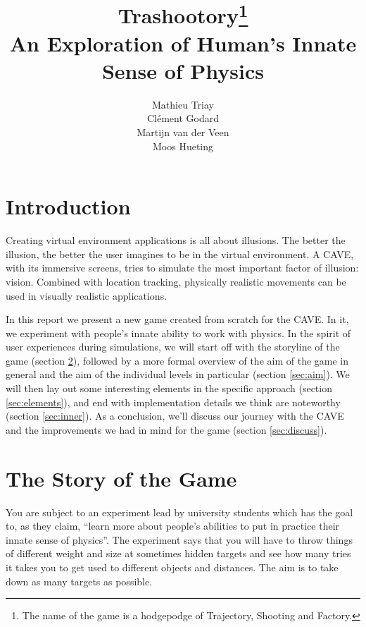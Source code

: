 \documentclass[a4paper]{article}
\title{Trashootory\footnote{The name of the game is a hodgepodge of Trajectory, Shooting and Factory.} \\ An Exploration of Human's Innate Sense of Physics}
\author{Mathieu Triay \\ Cl\'ement Godard \\ Martijn van der Veen \\ Moos
Hueting}
\begin{document}
\maketitle

\tableofcontents
\pagebreak



\section{Introduction}
Creating virtual environment applications is all about illusions. The better the
illusion, the better the user imagines to be in the virtual environment. A CAVE, 
with its immersive screens, tries to simulate the most important factor of illusion: 
vision. Combined with location tracking, physically realistic movements can be used 
in visually realistic applications.

In this report we present a new game created from scratch for the CAVE. In it, we experiment
with people's innate ability to work with physics. In the spirit of user experiences during
simulations, we will start off with the storyline of the game (section \ref{sec:story}),
followed by a more formal overview of the aim of the game in general and the aim of the
individual levels in particular (section \ref{sec:aim}). We will then lay out some
interesting elements in the specific approach (section \ref{sec:elements}), and end with
implementation details we think are noteworthy (section \ref{sec:inner}). As a conclusion, we'll discuss our journey with the CAVE and the improvements we had in mind for the game (section \ref{sec:discuss}).


\section{The Story of the Game}
\label{sec:story}
You are subject to an experiment lead by university students which has the goal to, as they claim, 
``learn more about people's abilities to put in practice their innate sense of
physics''. The experiment says that you will have to throw things of different
weight and size at sometimes hidden targets and see how many tries it takes you
to get used to different objects and distances. The aim is to take down as many
targets as possible.
\end{document}
